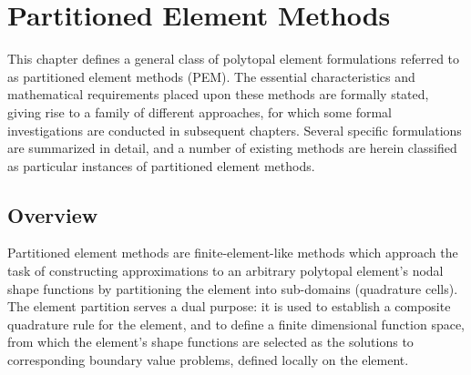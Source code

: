 \chapter{Partitioned Element Methods} \label{ch:pem}
%
This chapter defines a general class of polytopal element formulations referred to as partitioned element methods (PEM). The essential characteristics and mathematical requirements placed upon these methods are formally stated, giving rise to a family of different approaches, for which some formal investigations are conducted in subsequent chapters. Several specific formulations are summarized in detail, and a number of existing methods are herein classified as particular instances of partitioned element methods.

\section{Overview}


Partitioned element methods are finite-element-like methods which approach the task of constructing approximations to an arbitrary polytopal element's nodal shape functions by partitioning the element into sub-domains (quadrature cells). The element partition serves a dual purpose: it is used to establish a composite quadrature rule for the element, and to define a finite dimensional function space, from which the element's shape functions are selected as the solutions to corresponding boundary value problems, defined locally on the element.


